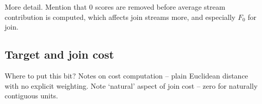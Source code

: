 \color{red}More detail. Mention that 0 scores are removed before average stream contribution is computed, which affects join streams more, and especially $F_0$ for join.\color{black}

\subsection{Target and join cost}

\color{red}Where to put this bit?\color{black}
Notes on cost computation -- plain Euclidean distance with no explicit weighting. Note `natural' aspect of join cost -- zero for naturally contiguous units.





